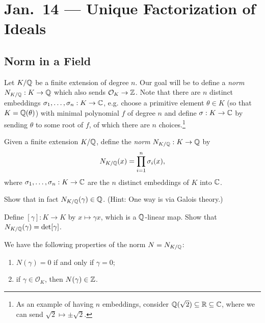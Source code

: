 \chapter{Jan.~14 --- Unique Factorization of Ideals}

\section{Norm in a Field}

\begin{remark}
  Let $K / \mathbb{Q}$ be a finite extension of degree $n$.
  Our goal will be to define a \emph{norm}
  $N_{K / \mathbb{Q}} : K \to \mathbb{Q}$ which also sends
  $\mathcal{O}_K \to \mathbb{Z}$. Note that there are $n$
  distinct embeddings $\sigma_1, \dots, \sigma_n : K \to \mathbb{C}$, e.g.
  choose a primitive element $\theta \in K$
  (so that $K = \mathbb{Q}(\theta)$) with minimal polynomial
  $f$ of degree $n$ and define
  $\sigma : K \to \mathbb{C}$ by sending $\theta$ to
  some root of $f$, of which there are $n$ choices.\footnote{As an example of having $n$ embeddings, consider $\mathbb{Q}(\sqrt{2}) \subseteq \mathbb{R} \subseteq \mathbb{C}$, where we can send $\sqrt{2} \mapsto \pm \sqrt{2}$.}
\end{remark}

\begin{definition}
  Given a finite extension $K / \mathbb{Q}$, define the
  \emph{norm} $N_{K / \mathbb{Q}} : K \to \mathbb{Q}$ by
  \[
    N_{K / \mathbb{Q}}(x) = \prod_{i = 1}^n \sigma_i(x),
  \]
  where $\sigma_1, \dots, \sigma_n : K \to \mathbb{C}$
  are the $n$ distinct embeddings of $K$ into $\mathbb{C}$.
\end{definition}

\begin{exercise}
  Show that in fact $N_{K / \mathbb{Q}}(\gamma) \in \mathbb{Q}$. (Hint: One way is via Galois theory.)
\end{exercise}

\begin{exercise}
  Define $[\gamma] : K \to K$ by $x \mapsto \gamma x$,
  which is a $\mathbb{Q}$-linear map. Show that
  $N_{K / \mathbb{Q}}(\gamma) = \det [\gamma]$.
\end{exercise}

\begin{prop}
  We have the following properties of the norm $N = N_{K / \mathbb{Q}}$:
  \begin{enumerate}
    \item $N(\gamma) = 0$ if and only if $\gamma = 0$;
    \item if $\gamma \in \mathcal{O}_K$, then
      $N(\gamma) \in \mathbb{Z}$.
  \end{enumerate}
\end{prop}

